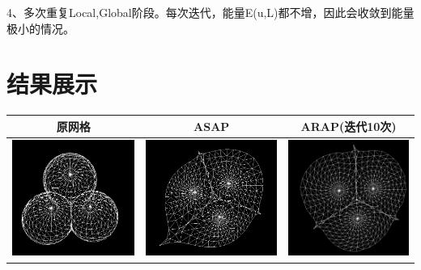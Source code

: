 \documentclass[12pt]{article}
\begin{document}
4、多次重复Local,Global阶段。每次迭代，能量E(u,L)都不增，因此会收敛到能量极小的情况。


\section{结果展示}
\begin{table}[htb]
\begin{center}
\begin{tabular}{|c|c|c|}
  \hline
  原网格 &ASAP &ARAP(迭代10次) \\\hline

\includegraphics[height=1.5in]{10.png}&\includegraphics[height=1.5in]{11.png}&\includegraphics[height=1.5in]{12.png}\\

\end{tabular}
\end{center}
\end{table}
\end{document}
